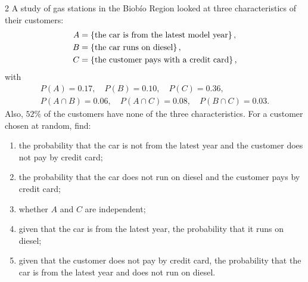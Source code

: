 \begin{homework}{2}
A study of gas stations in the Biob\'io Region looked at three characteristics of their customers:
\begin{align*}
A &= \left\{\text{the car is from the latest model year}\right\},\\
B &= \left\{\text{the car runs on diesel}\right\},\\
C &= \left\{\text{the customer pays with a credit card}\right\},
\end{align*}
with
\begin{gather*}
P(A) = 0.17,\quad P(B) = 0.10,\quad P(C) = 0.36,\\
P(A \cap B) = 0.06,\quad P(A \cap C) = 0.08,\quad P(B \cap C) = 0.03.
\end{gather*}
Also, $52\%$ of the customers have none of the three characteristics. For a customer chosen at random, find:
\begin{enumerate}[label=(\roman*)]
\item the probability that the car is not from the latest year and the customer does not pay by credit card;
\item the probability that the car does not run on diesel and the customer pays by credit card;
\item whether $A$ and $C$ are independent;
\item given that the car is from the latest year, the probability that it runs on diesel;
\item given that the customer does not pay by credit card, the probability that the car is from the latest year and does not run on diesel.
\end{enumerate}


\end{homework}

